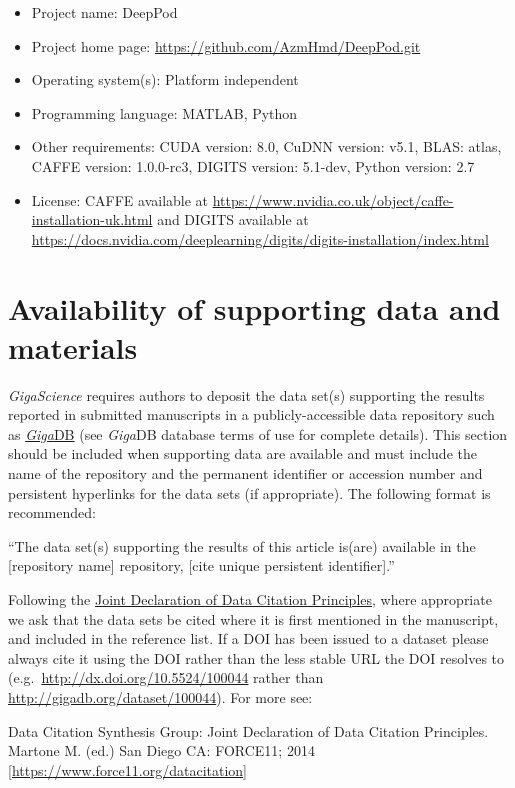 \documentclass[a4paper,num-refs]{oup-contemporary}
\begin{document}
\begin{itemize}
\item Project name: DeepPod
\item Project home page: \url{https://github.com/AzmHmd/DeepPod.git}
\item Operating system(s): Platform independent
\item Programming language: MATLAB, Python
\item Other requirements:  CUDA version: 8.0, CuDNN version: v5.1, BLAS: atlas, CAFFE version: 1.0.0-rc3, DIGITS version: 5.1-dev, Python version: 2.7
\item License: CAFFE available at \url{https://www.nvidia.co.uk/object/caffe-installation-uk.html}
and DIGITS available at \url{https://docs.nvidia.com/deeplearning/digits/digits-installation/index.html}
\end{itemize}

\section{Availability of supporting data and materials}

\textit{GigaScience} requires authors to deposit the data set(s) supporting the results reported in submitted manuscripts in a publicly-accessible data repository such as \href{http://gigadb.org/}{\textit{Giga}DB} (see \textit{Giga}DB database terms of use for complete details). This section should be included when supporting data are available and must include the name of the repository and the permanent identifier or accession number and persistent hyperlinks for the data sets (if appropriate). The following format is recommended:

``The data set(s) supporting the results of this article is(are) available in the [repository name] repository, [cite unique persistent identifier].''

Following the \href{https://www.force11.org/group/joint-declaration-data-citation-principles-final}{Joint Declaration of Data Citation Principles}, where appropriate we ask that the data sets be cited where it is first mentioned in the manuscript, and included in the reference list. If a DOI has been issued to a dataset please always cite it using the DOI rather than the less stable URL the DOI resolves to (e.g.~\url{http://dx.doi.org/10.5524/100044} rather than \url{http://gigadb.org/dataset/100044}). For more see:

Data Citation Synthesis Group: Joint Declaration of Data Citation Principles. Martone M. (ed.) San Diego CA: FORCE11; 2014 [\url{https://www.force11.org/datacitation}]
\end{document}
